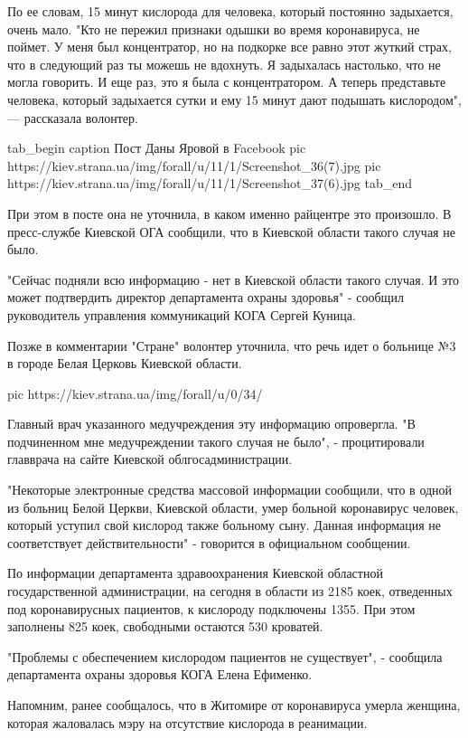 По ее словам, 15 минут кислорода для человека, который постоянно
задыхается, очень мало. "Кто не пережил признаки одышки во время
коронавируса, не поймет. У меня был концентратор, но на подкорке все равно
этот жуткий страх, что в следующий раз ты можешь не вдохнуть. Я задыхалась
настолько, что не могла говорить. И еще раз, это я была с концентратором.
А теперь представьте человека, который задыхается сутки и ему 15 минут
дают подышать кислородом", — рассказала волонтер.

\ifcmt
tab_begin
	caption Пост Даны Яровой в Facebook
	pic https://kiev.strana.ua/img/forall/u/11/1/Screenshot_36(7).jpg
	pic https://kiev.strana.ua/img/forall/u/11/1/Screenshot_37(6).jpg
tab_end
\fi

При этом в посте она не уточнила, в каком именно райцентре это произошло.
В пресс-службе Киевской ОГА сообщили, что в Киевской области такого случая
не было.

"Сейчас подняли всю информацию - нет в Киевской области такого случая. И
это может подтвердить директор департамента охраны здоровья" - сообщил
руководитель управления коммуникаций КОГА Сергей Куница.

Позже в комментарии "Стране" волонтер уточнила, что речь идет о больнице
№3 в городе Белая Церковь Киевской области.

\ifcmt
pic https://kiev.strana.ua/img/forall/u/0/34/%
\fi

Главный врач указанного медучреждения эту информацию опровергла. "В
подчиненном мне медучреждении такого случая не было", -  процитировали
главврача на сайте Киевской облгосадминистрации.

"Некоторые электронные средства массовой информации сообщили, что в одной
из больниц Белой Церкви, Киевской области, умер больной коронавирус
человек, который уступил свой кислород также больному сыну. Данная
информация не соответствует действительности" - говорится в официальном
сообщении.

По информации департамента здравоохранения Киевской областной
государственной администрации, на сегодня в области из 2185 коек,
отведенных под коронавирусных пациентов, к кислороду подключены 1355. При
этом заполнены 825 коек, свободными остаются 530 кроватей.

"Проблемы с обеспечением кислородом пациентов не существует", - сообщила
департамента охраны здоровья КОГА Елена Ефименко.

Напомним, ранее сообщалось, что в Житомире от коронавируса умерла женщина,
которая жаловалась мэру на отсутствие кислорода в реанимации.

